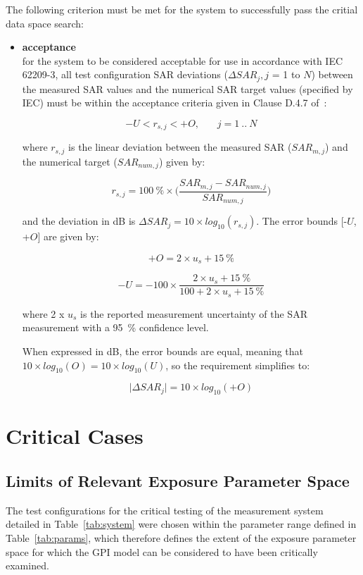 \documentclass{article}
\begin{document}
The following criterion must be met for the system to successfully pass the critial data space search:

\begin{itemize}
\item \textbf{acceptance}\\ for the system to be considered acceptable for use in accordance with IEC 62209-3, all test configuration SAR deviations ($\Delta SAR_j, j$ = 1 to $N$) between the measured SAR values and the numerical SAR target values (specified by IEC) must be within the acceptance criteria given in Clause D.4.7 of~\cite{standard}:

\[
-U < r_{s,j} < +O, ~~~~~~~~ j = 1~..~N
\]

where $r_{s,j}$ is the linear deviation between the measured SAR ($SAR_{m,j}$) and the numerical target ($SAR_{num,j}$) given by:

\[
r_{s,j} = 100~\% \times \Big(\frac{SAR_{m,j} - SAR_{num,j}}{SAR_{num,j}}\Big)
\]

and the deviation in dB is $\Delta SAR_j = 10 \times log_{10} (r_{s,j})$. The error bounds [-$U$, +$O$] are given by:

\[
+O = 2 \times u_s + 15~\%
\]

\[
-U = -100 \times \frac{2 \times u_s + 15~\%}{100 + 2 \times u_s + 15~\%}
\]

where 2 x $u_s$ is the reported measurement uncertainty of the SAR measurement with a 95~\% confidence level.

When expressed in dB, the error bounds are equal, meaning that $10 \times log_{10}(O) = 10 \times log_{10}(U)$, so the requirement simplifies to:

\[
\big|\Delta SAR_j\big| = 10 \times log_{10}(+O)
\]
\end{itemize}

\section{Critical Cases}

\subsection{Limits of Relevant Exposure Parameter Space}
The test configurations for the critical testing of the measurement system detailed in Table~\ref{tab:system} were chosen within the parameter range defined in Table~\ref{tab:params}, which therefore defines the extent of the exposure parameter space for which the GPI model can be considered to have been critically examined.
\end{document}
